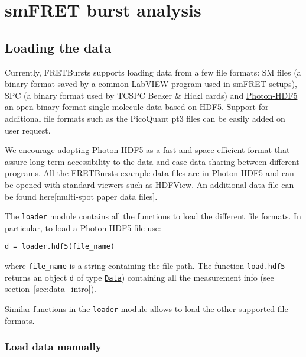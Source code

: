 \section{smFRET burst analysis}
\label{sec:analysis}

\subsection{Loading the data}
\label{sec:dataload}

Currently, FRETBursts supports loading data from a few file formats: SM files
(a binary format saved by a common LabVIEW program used in smFRET setups), 
SPC (a binary format used by TCSPC Becker \& Hickl cards) and 
\href{http://photon-hdf5.readthedocs.org/}{Photon-HDF5}  an open binary 
format single-molecule data based on HDF5. Support for additional file formats
such as the PicoQuant pt3 files can be easily added on user request.

We encourage adopting \href{http://photon-hdf5.readthedocs.org/}{Photon-HDF5}
as a fast and space efficient format that assure long-term accessibility 
to the data and ease data sharing between different programs. All the 
FRETBursts example data files are in Photon-HDF5 and can be opened with 
standard viewers such as 
\href{http://www.hdfgroup.org/products/java/hdfview/}{HDFView}. An additional data file 
can be found here[multi-spot paper data files].

The \href{http://fretbursts.readthedocs.org/en/latest/loader.html}{\texttt{loader} module}
contains all the functions to load the different file formats. 
In particular, to load a Photon-HDF5 file use:

\begin{verbatim}
d = loader.hdf5(file_name)
\end{verbatim}

where \verb|file_name| is a string containing the file path. The function
\verb|load.hdf5| returns an object \verb|d| of type 
\href{http://fretbursts.readthedocs.org/en/latest/data_class.html}{\texttt{Data}}) 
containing all the measurement info (see section~\ref{sec:data_intro}).

Similar functions in the 
\href{http://fretbursts.readthedocs.org/en/latest/loader.html}{\texttt{loader} module} 
allows to load the other supported file formats.

\subsubsection{Load data manually}

